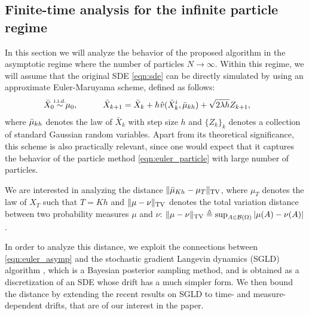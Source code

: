 
\subsection{Finite-time analysis for the infinite particle regime}



In this section we will analyze the behavior of the proposed algorithm in the asymptotic regime where the number of particles $N \rightarrow \infty$. Within this regime, we will assume that the original SDE \eqref{eqn:sde} can be directly simulated by using an approximate Euler-Maruyama scheme, defined as follows:
\begin{align}
\bar{X}_0 \simiid \mu_0, \quad \qquad \bar{X}_{k+1} = \bar{X}_k + h \hspace{0.5pt} \hat{v}(\bar{X}^i_k, \bar{\mu}_{kh} ) + \sqrt{2 \lambda h} Z_{k+1}, \qquad \label{eqn:euler_asymp}
\end{align}
where $\bar{\mu}_{kh}$ denotes the law of $\bar{X}_k$ with step size $h$ and $\{Z_k\}_{k}$ denotes a collection of standard Gaussian random variables. Apart from its theoretical significance, this scheme is also practically relevant, since one would expect that it captures the behavior of the particle method \eqref{eqn:euler_particle} with large number of particles. 

We are interested in analyzing the distance $\| \bar{\mu}_{Kh} - \mu_{T} \|_{\textnormal{TV}}$, where $\mu_T$ denotes the law of $X_T$ such that $T=Kh$ and $\|\mu-\nu\|_{\textnormal{TV}}$ denotes the total variation distance between two probability measures $\mu$ and $\nu$: $\|\mu-\nu\|_{\textnormal{TV}}\triangleq \sup_{A \in {\cal B}(\Omega)} |\mu(A) -\nu(A) |$. 
%

In order to analyze this distance, we exploit the connections between \eqref{eqn:euler_asymp} and the stochastic gradient Langevin dynamics (SGLD) algorithm \cite{WelTeh2011a}, which is a Bayesian posterior sampling method, and is obtained as a discretization of an SDE whose drift has a much simpler form. We then bound the distance by extending the recent results on SGLD \cite{raginsky17a} to time- and measure-dependent drifts, that are of our interest in the paper.

